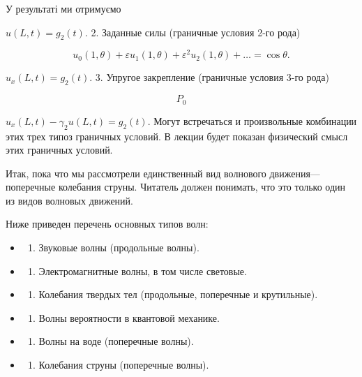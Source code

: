 \documentclass[
  ukrainian,
]{article}
\providecommand{\tightlist}{%
  \setlength{\itemsep}{0pt}\setlength{\parskip}{0pt}}
\begin{document}
У результаті ми отримуємо

\(u(L, t) = g_2(t).\) 2. Заданные силы (граничные условия 2-го рода)

\[
u_0 (1, \theta) + \varepsilon u_1 (1, \theta) + \varepsilon^2 u_2 (1, \theta) + \ldots = \cos \theta.
\]

\(u_x(L, t) = g_2(t).\) 3. Упругое закрепление (граничные условия 3-го
рода)

\[
P_{0}
\]

\(u_x(L, t) - \gamma_2 u(L, t) = g_2(t).\) Могут встречаться и
произвольные комбинации этих трех типоз граничных условий. В лекции
будет показан физический смысл этих граничных условий.

Итак, пока что мы рассмотрели единственный вид волнового
движения---поперечные колебания струны. Читатель должен понимать, что
это только один из видов волновых движений.

Ниже приведен перечень основных типов волн:

\begin{itemize}
\tightlist
\item
  \begin{enumerate}
  \def\labelenumi{\arabic{enumi}.}
  \tightlist
  \item
    Звуковые волны (продольные волны).
  \end{enumerate}
\item
  \begin{enumerate}
  \def\labelenumi{\arabic{enumi}.}
  \setcounter{enumi}{1}
  \tightlist
  \item
    Электромагнитные волны, в том числе световые.
  \end{enumerate}
\item
  \begin{enumerate}
  \def\labelenumi{\arabic{enumi}.}
  \setcounter{enumi}{2}
  \tightlist
  \item
    Колебания твердых тел (продольные, поперечные и крутильные).
  \end{enumerate}
\item
  \begin{enumerate}
  \def\labelenumi{\arabic{enumi}.}
  \setcounter{enumi}{3}
  \tightlist
  \item
    Волны вероятности в квантовой механике.
  \end{enumerate}
\item
  \begin{enumerate}
  \def\labelenumi{\arabic{enumi}.}
  \setcounter{enumi}{4}
  \tightlist
  \item
    Волны на воде (поперечные волны).
  \end{enumerate}
\item
  \begin{enumerate}
  \def\labelenumi{\arabic{enumi}.}
  \setcounter{enumi}{5}
  \tightlist
  \item
    Колебания струны (поперечные волны).
  \end{enumerate}
\end{itemize}
\end{document}
